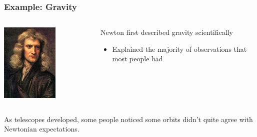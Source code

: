 \documentclass[10pt]{beamer}
\begin{document}
\begin{frame}[t]
\frametitle{Example: Gravity}
\vspace{0.25cm}

	\begin{columns}
		\begin{column}{0.3\textwidth}
			\begin{center}
				\includegraphics[width=0.6\textwidth]{figures/newton.jpg}
			\end{center}
		\end{column}
		
		\begin{column}{0.7\textwidth}
			Newton first described gravity scientifically
				\begin{itemize}
					\item Explained the majority of observations that most people had\\
				\end{itemize}
		\end{column}
	\end{columns}
	
	\vspace{0.25cm}
	
	\begin{center}
		As telescopes developed, some people noticed some orbits didn't quite agree with Newtonian expectations.\\
	\end{center}
	

\end{frame}
\end{document}
